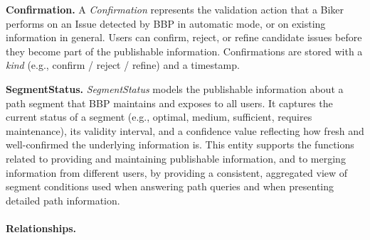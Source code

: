 \textbf{Confirmation.}
A \textit{Confirmation} represents the validation action that a Biker performs on an Issue detected by BBP in automatic mode, or on existing information in general.
Users can confirm, reject, or refine candidate issues before they become part of the publishable information.
Confirmations are stored with a \textit{kind} (e.g., confirm / reject / refine) and a timestamp.

\textbf{SegmentStatus.}
\textit{SegmentStatus} models the publishable information about a path segment that BBP maintains and exposes to all users.
It captures the current status of a segment (e.g., optimal, medium, sufficient, requires maintenance), its validity interval, and a confidence value reflecting how fresh and well-confirmed the underlying information is.
This entity supports the functions related to providing and maintaining publishable information, and to merging information from different users, by providing a consistent, aggregated view of segment conditions used when answering path queries and when presenting detailed path information.

\paragraph{Relationships.}

